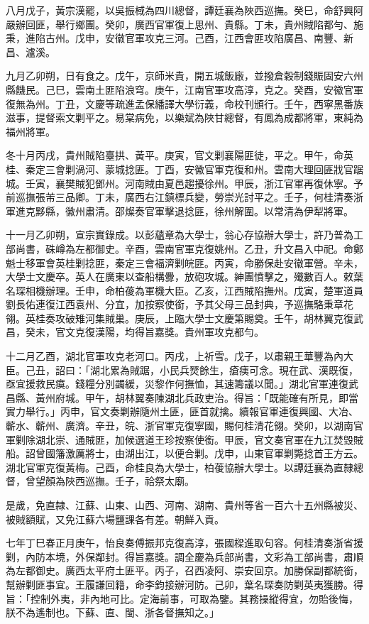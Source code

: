 \begin{pinyinscope}
八月戊子，黃宗漢罷，以吳振棫為四川總督，譚廷襄為陜西巡撫。癸巳，命舒興阿嚴辦回匪，舉行鄉團。癸卯，廣西官軍復上思州、貴縣。丁未，貴州賊陷都勻、施秉，進陷古州。戊申，安徽官軍攻克三河。己酉，江西會匪攻陷廣昌、南豐、新昌、瀘溪。

九月乙卯朔，日有食之。戊午，京師米貴，開五城飯廠，並撥倉穀制錢賑固安六州縣饑民。己巳，雲南土匪陷浪穹。庚午，江南官軍攻高淳，克之。癸酉，安徽官軍復無為州。丁丑，文慶等疏進孟保繙譯大學衍義，命校刊頒行。壬午，西寧黑番族滋事，提督索文剿平之。易棠病免，以樂斌為陜甘總督，有鳳為成都將軍，東純為福州將軍。

冬十月丙戌，貴州賊陷臺拱、黃平。庚寅，官文剿襄陽匪徒，平之。甲午，命英桂、秦定三會剿渦河、蒙城捻匪。丁酉，安徽官軍克復和州。雲南大理回匪戕官踞城。壬寅，襄樊賊犯鄧州。河南賊由夏邑趨擾徐州。甲辰，浙江官軍再復休寧。予前巡撫張芾三品卿。丁未，廣西右江鎮標兵變，勞崇光討平之。壬子，何桂清奏浙軍進克黟縣，徽州肅清。邵燦奏官軍擊退捻匪，徐州解圍。以常清為伊犁將軍。

十一月乙卯朔，宣宗實錄成。以彭蘊章為大學士，翁心存協辦大學士，許乃普為工部尚書，硃嶟為左都御史。辛酉，雲南官軍克復姚州。乙丑，升文昌入中祀。命鄭魁士移軍會英桂剿捻匪，秦定三會福濟剿皖匪。丙寅，命勝保赴安徽軍營。辛未，大學士文慶卒。英人在廣東以查船構釁，放砲攻城。紳團憤擊之，殲數百人。敕葉名琛相機辦理。壬申，命柏葰為軍機大臣。乙亥，江西賊陷撫州。戊寅，楚軍道員劉長佑連復江西袁州、分宜，加按察使銜，予其父母三品封典，予巡撫駱秉章花翎。英桂奏攻破雉河集賊巢。庚辰，上臨大學士文慶第賜奠。壬午，胡林翼克復武昌，癸未，官文克復漢陽，均得旨嘉獎。貴州軍攻克都勻。

十二月乙酉，湖北官軍攻克老河口。丙戌，上祈雪。戊子，以肅親王華豐為內大臣。己丑，詔曰：「湖北累為賊踞，小民兵燹餘生，瘡痍可念。現在武、漢既復，亟宜援救民瘼。錢糧分別蠲緩，災黎作何撫恤，其速籌議以聞。」湖北官軍連復武昌縣、黃州府城。甲午，胡林翼奏陳湖北兵政吏治。得旨：「既能確有所見，即當實力舉行。」丙申，官文奏剿辦隨州土匪，匪首就擒。續報官軍連復興國、大冶、蘄水、蘄州、廣濟。辛丑，皖、浙官軍克復寧國，賜何桂清花翎。癸卯，以湖南官軍剿除湖北崇、通賊匪，加候選道王珍按察使銜。甲辰，官文奏官軍在九江焚毀賊船。詔曾國籓激厲將士，由湖出江，以便合剿。戊申，山東官軍剿斃捻首王方云。湖北官軍克復黃梅。己酉，命桂良為大學士，柏葰協辦大學士。以譚廷襄為直隸總督，曾望顏為陜西巡撫。壬子，祫祭太廟。

是歲，免直隸、江蘇、山東、山西、河南、湖南、貴州等省一百六十五州縣被災、被賊額賦，又免江蘇六場鹽課各有差。朝鮮入貢。

七年丁巳春正月庚午，怡良奏傅振邦克復高淳，張國樑進取句容。何桂清奏浙省援剿，內防本境，外保鄰封。得旨嘉獎。調全慶為兵部尚書，文彩為工部尚書，肅順為左都御史。廣西太平府土匪平。丙子，召西凌阿、崇安回京。加勝保副都統銜，幫辦剿匪事宜。王履謙回籍，命李鈞接辦河防。己卯，葉名琛奏防剿英夷獲勝。得旨：「控制外夷，非內地可比。定海前事，可取為鑒。其務操縱得宜，勿貽後悔，朕不為遙制也。下蘇、直、閩、浙各督撫知之。」


\end{pinyinscope}
